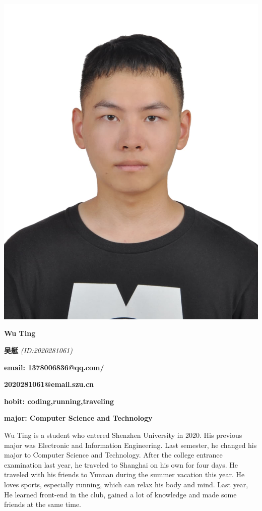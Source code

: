 \documentclass[UTF8]{ctexart}
\begin{document}
\begin{flushleft}
    
    \includegraphics[scale = 0.06]{me}

    \LARGE{\textbf{Wu Ting}}

    \LARGE{\textbf{吴艇}}
    \textsl{(ID:2020281061)}
    
\end{flushleft}

\begin{flushright}
    \vspace*{-150pt}
    \Large{\textbf{email: 1378006836@qq.com/}}

    \Large{\textbf{2020281061@email.szu.cn}}

    \Large{\textbf{hobit: coding,running,traveling}}  
    
    \Large{\textbf{major: Computer Science and Technology}}
  
\end{flushright}

\begin{flushleft}
    \vspace*{90pt}
    \Large{Wu Ting is a student who entered Shenzhen University in 2020.
     His previous major was Electronic and Information Engineering. 
     Last semester, he changed his major to Computer Science and Technology.
     After the college entrance examination last year, he traveled to Shanghai on his own for four days.
     He traveled with his friends to Yunnan during the summer vacation this year. 
     He loves sports, especially running, which can relax his body and mind.
     Last year, He learned front-end in the club, gained a lot of knowledge and made some friends at the same time.
     }
\end{flushleft}
\end{document}

